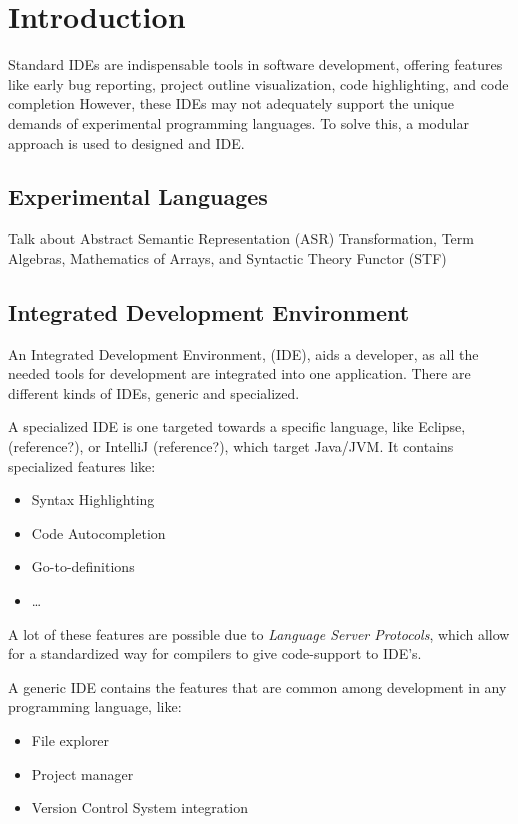 \chapter{Introduction}

Standard IDEs are indispensable tools in software development, offering features
like early bug reporting, project outline visualization, code highlighting, and
code completion However, these IDEs may not adequately support the unique
demands of experimental programming languages.
To solve this, a modular approach is used to designed and IDE.

\section{Experimental Languages}

Talk about Abstract Semantic Representation (ASR) Transformation,
Term Algebras, Mathematics of Arrays, and Syntactic Theory Functor (STF)

\section{Integrated Development Environment}

An Integrated Development Environment, (IDE), aids a developer, as all the
needed tools for development are integrated into one application. There are
different kinds of IDEs, generic and specialized.

A specialized IDE is one targeted towards a specific language, like Eclipse,
(reference?), or IntelliJ (reference?), which target Java/JVM. It contains
specialized features like:

\begin{itemize}
  \item Syntax Highlighting
  \item Code Autocompletion
  \item Go-to-definitions
  \item \dots
\end{itemize}

A lot of these features are possible due to \textit{Language Server Protocols},
which allow for a standardized way for compilers to give code-support to IDE's.


A generic IDE contains the features that are common among development in any
programming language, like:

\begin{itemize}
  \item File explorer
  \item Project manager
  \item Version Control System integration
\end{itemize}
